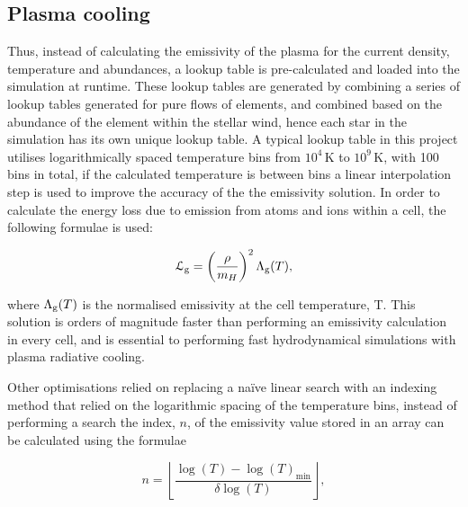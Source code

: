 \subsection{Plasma cooling}



Thus, instead of calculating the emissivity of the plasma for the current density, temperature and abundances, a lookup table is pre-calculated and loaded into the simulation at runtime.
These lookup tables are generated by combining a series of lookup tables generated for pure flows of elements, and combined based on the abundance of the element within the stellar wind, hence each star in the simulation has its own unique lookup table.
A typical lookup table in this project utilises logarithmically spaced temperature bins from $10^4\,\si{\kelvin}$ to $10^9\,\si{\kelvin}$, with 100 bins in total, if the calculated temperature is between bins a linear interpolation step is used to improve the accuracy of the the emissivity solution.
In order to calculate the energy loss due to emission from atoms and ions within a cell, the following formulae is used:

\begin{equation}
  \mathcal{L}_\text{g} = \left(\frac{\rho}{m_H}\right)^2 \Lambda_\text{g} (T) ,
\end{equation}

\noindent
where $\Lambda_\text{g}(T)$ is the normalised emissivity at the cell temperature, T.
This solution is orders of magnitude faster than performing an emissivity calculation in every cell, and is essential to performing fast hydrodynamical simulations with plasma radiative cooling.



Other optimisations relied on replacing a na\"ive linear search with an indexing method that relied on the logarithmic spacing of the temperature bins, instead of performing a search the index, $n$, of the emissivity value stored in an array can be calculated using the formulae

\begin{equation}
    n = \left \lfloor \frac{\log(T) - \log(T)_\text{min}}{\delta \log (T)} \right \rfloor ,
\end{equation}

